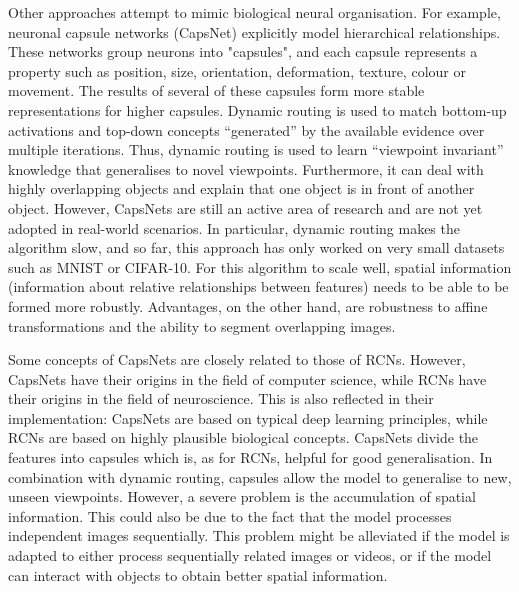 Other approaches attempt to mimic biological neural organisation. For example, neuronal capsule networks (CapsNet) explicitly model hierarchical relationships. These networks group neurons into "capsules", and each capsule represents a property such as position, size, orientation, deformation, texture, colour or movement. The results of several of these capsules form more stable representations for higher capsules. Dynamic routing is used to match bottom-up activations and top-down concepts ``generated'' by the available evidence over multiple iterations. Thus, dynamic routing is used to learn ``viewpoint invariant'' knowledge that generalises to novel viewpoints. Furthermore, it can deal with highly overlapping objects and explain that one object is in front of another object. However, CapsNets are still an active area of research and are not yet adopted in real-world scenarios. In particular, dynamic routing makes the algorithm slow, and so far, this approach has only worked on very small datasets such as MNIST or CIFAR-10. For this algorithm to scale well, spatial information (information about relative relationships between features) needs to be able to be formed more robustly. Advantages, on the other hand, are robustness to affine transformations and the ability to segment overlapping images.

Some concepts of CapsNets are closely related to those of RCNs. However, CapsNets have their origins in the field of computer science, while RCNs have their origins in the field of neuroscience. This is also reflected in their implementation: CapsNets are based on typical deep learning principles, while RCNs are based on highly plausible biological concepts. CapsNets divide the features into capsules which is, as for RCNs, helpful for good generalisation. In combination with dynamic routing, capsules allow the model to generalise to new, unseen viewpoints. However, a severe problem is the accumulation of spatial information. This could also be due to the fact that the model processes independent images sequentially. This problem might be alleviated if the model is adapted to either process sequentially related images or videos, or if the model can interact with objects to obtain better spatial information.

